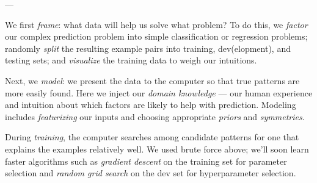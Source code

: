 \documentclass[11pt, justified]{tufte-book}
\newcommand{\sampassage}[1]{
   \vspace{0.1cm}
   \par\noindent{\hspace{-2cm}\normalsize \sc \gre #1} ---
}
\theoremstyle{definition}
\begin{document}


      \sampassage{workflow}
        We first \emph{frame}: what data will help us solve what problem?  To
        do this, we \emph{factor} our complex prediction problem into simple
        classification or regression problems; randomly \emph{split} the
        resulting example pairs into training, dev(elopment), and testing sets;
        and \emph{visualize} the training data to weigh our intuitions. 

        Next, we \emph{model}: we present the data to the computer so that
        true patterns are more easily found.
        Here we inject our \emph{domain knowledge} --- our human experience and
        intuition about which factors are likely to help with prediction.
        Modeling includes \emph{featurizing} our inputs and choosing
        appropriate \emph{priors} and \emph{symmetries}.

        During \emph{training}, the computer searches among candidate patterns
        for one that explains the examples relatively well.
        We used brute force above; we'll soon learn faster algorithms
        such as \emph{gradient descent} on the training set for parameter
        selection and \emph{random grid search} on the dev set for
        hyperparameter selection.
\end{document}
